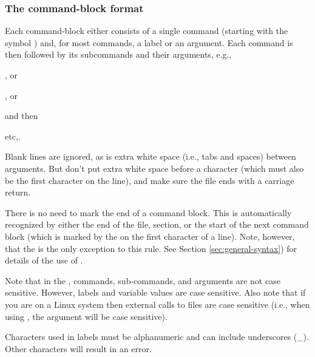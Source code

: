 \subsubsection{The command-block format}

Each command-block either consists of a single command (starting with the symbol \@) and, for most commands, a label or an argument. Each command is then followed by its subcommands and their arguments, e.g., 

\begin{description}
\item {}, or 
\item {} , or
\item {} 
\end{description}

and then
\begin{description}
\item {} 
\item {} 
\item etc,.
\end{description}

Blank lines are ignored, as is extra white space (i.e., tabs and spaces) between arguments. But don't put extra white space before a \command{} character (which must also be the first character on the line), and make sure the file ends with a carriage return. 

There is no need to mark the end of a command block. This is automatically recognized by either the end of the file, section, or the start of the next command block (which is marked by the \command{} on the first character of a line). Note, however, that the  is the only exception to this rule. See Section \ref{sec:general-syntax}) for details of the use of . 

Note that in the \config, commands, sub-commands, and arguments are not case sensitive. However, labels and variable values are case sensitive. Also note that if you are on a Linux system then external calls to files are case sensitive (i.e., when using  , the argument  will be case sensitive). 

Characters used in labels must be alphanumeric and can include underscores (\_). Other characters will result in an error.

